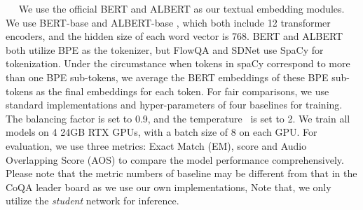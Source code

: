 \documentclass[11pt]{article}
\newcommand{\myparagraph}[1]{\vspace{2pt}\noindent{\bf{#1}}~~}
\begin{document}
\myparagraph{Experiment Settings.}
We use the official BERT \cite{devlin2018bert} and ALBERT \cite{lan2019albert} as our textual embedding modules. We use BERT-base \cite{devlin2018bert} and ALBERT-base \cite{lan2019albert}, which both include 12 transformer encoders, and the hidden size of each word vector is 768. BERT and ALBERT both utilize BPE as the tokenizer, but FlowQA and SDNet use SpaCy \cite{spacy2} for tokenization. Under the circumstance when tokens in spaCy \cite{spacy2} correspond to more than one BPE sub-tokens, we average the BERT embeddings of these BPE sub-tokens as the final embeddings for each token. For fair comparisons, we use standard implementations and hyper-parameters of four baselines for training. The balancing factor  is set to 0.9, and the temperature~ is set to 2. We train all models on 4 24GB RTX GPUs, with a batch size of 8 on each GPU. For evaluation, we use three metrics: Exact Match (EM),  score and Audio Overlapping Score (AOS) \cite{li2018spoken}  to compare the model performance comprehensively. Please note that the metric numbers of baseline may be different from that in the CoQA leader board as we use our own implementations, Note that, we only utilize the {\em student} network for inference.
\end{document}
